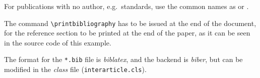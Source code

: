 \documentclass[unicode-math]{interarticle}
\newcommand\comm[1]{\texttt{\textbackslash #1}}
\begin{document}
For publications with no author, e.g.\ standards, use the common names as \citet{EN1995-1-1engl} or \citet{EN14080-2013}.\par

The command \comm{printbibliography} has to be issued at the end of the document, for the reference section to be printed at the end of the paper, as it can be seen in the source code of this example.\par

The format for the \texttt{*.bib} file is \emph{biblatex}, and the backend is \emph{biber}, but can be modified in the \emph{class} file (\texttt{interarticle.cls}).\par

\printbibliography[heading=bibnumbered]
\end{document}
